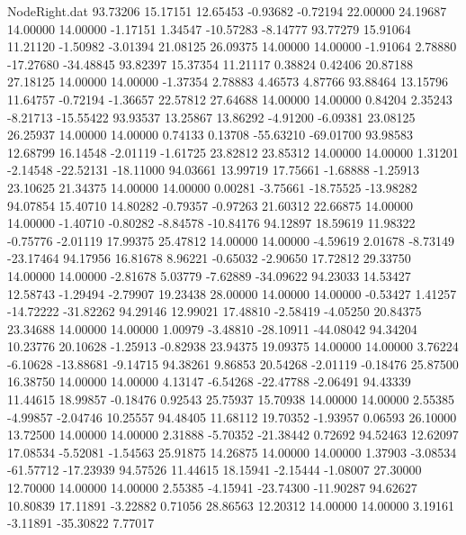 \begin{filecontents}{NodeRight.dat}
  93.73206   15.17151   12.65453    -0.93682   -0.72194   22.00000   24.19687   14.00000   14.00000   -1.17151    1.34547  -10.57283   -8.14777
  93.77279   15.91064   11.21120    -1.50982   -3.01394   21.08125   26.09375   14.00000   14.00000   -1.91064    2.78880  -17.27680  -34.48845
  93.82397   15.37354   11.21117     0.38824    0.42406   20.87188   27.18125   14.00000   14.00000   -1.37354    2.78883    4.46573    4.87766
  93.88464   13.15796   11.64757    -0.72194   -1.36657   22.57812   27.64688   14.00000   14.00000    0.84204    2.35243   -8.21713  -15.55422
  93.93537   13.25867   13.86292    -4.91200   -6.09381   23.08125   26.25937   14.00000   14.00000    0.74133    0.13708  -55.63210  -69.01700
  93.98583   12.68799   16.14548    -2.01119   -1.61725   23.82812   23.85312   14.00000   14.00000    1.31201   -2.14548  -22.52131  -18.11000
  94.03661   13.99719   17.75661    -1.68888   -1.25913   23.10625   21.34375   14.00000   14.00000    0.00281   -3.75661  -18.75525  -13.98282
  94.07854   15.40710   14.80282    -0.79357   -0.97263   21.60312   22.66875   14.00000   14.00000   -1.40710   -0.80282   -8.84578  -10.84176
  94.12897   18.59619   11.98322    -0.75776   -2.01119   17.99375   25.47812   14.00000   14.00000   -4.59619    2.01678   -8.73149  -23.17464
  94.17956   16.81678    8.96221    -0.65032   -2.90650   17.72812   29.33750   14.00000   14.00000   -2.81678    5.03779   -7.62889  -34.09622
  94.23033   14.53427   12.58743    -1.29494   -2.79907   19.23438   28.00000   14.00000   14.00000   -0.53427    1.41257  -14.72222  -31.82262
  94.29146   12.99021   17.48810    -2.58419   -4.05250   20.84375   23.34688   14.00000   14.00000    1.00979   -3.48810  -28.10911  -44.08042
  94.34204   10.23776   20.10628    -1.25913   -0.82938   23.94375   19.09375   14.00000   14.00000    3.76224   -6.10628  -13.88681   -9.14715
  94.38261    9.86853   20.54268    -2.01119   -0.18476   25.87500   16.38750   14.00000   14.00000    4.13147   -6.54268  -22.47788   -2.06491
  94.43339   11.44615   18.99857    -0.18476    0.92543   25.75937   15.70938   14.00000   14.00000    2.55385   -4.99857   -2.04746   10.25557
  94.48405   11.68112   19.70352    -1.93957    0.06593   26.10000   13.72500   14.00000   14.00000    2.31888   -5.70352  -21.38442    0.72692
  94.52463   12.62097   17.08534    -5.52081   -1.54563   25.91875   14.26875   14.00000   14.00000    1.37903   -3.08534  -61.57712  -17.23939
  94.57526   11.44615   18.15941    -2.15444   -1.08007   27.30000   12.70000   14.00000   14.00000    2.55385   -4.15941  -23.74300  -11.90287
  94.62627   10.80839   17.11891    -3.22882    0.71056   28.86563   12.20312   14.00000   14.00000    3.19161   -3.11891  -35.30822    7.77017

\end{filecontents}
